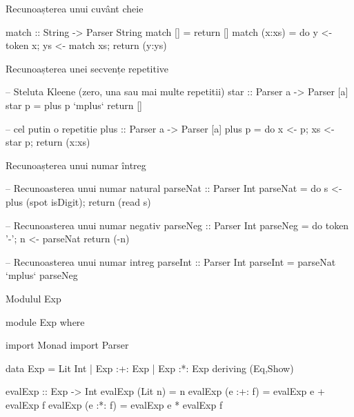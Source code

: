 \documentclass[xcolor=pdftex,romanian,colorlinks]{beamer}
\begin{document}
\begin{frame}[fragile]{Recunoașterea unui cuvânt cheie}
\begin{asciihs}
  match :: String -> Parser String
  match []      = return []
  match (x:xs) = do
                     y <- token x;
                     ys <- match xs;
                     return (y:ys)
\end{asciihs}
\end{frame}



\begin{frame}[fragile]{Recunoașterea unei secvențe repetitive}
\begin{asciihs}
  -- Steluta Kleene (zero, una sau mai multe repetitii)
  star :: Parser a -> Parser [a]
  star p = plus p `mplus` return []

  -- cel putin o repetitie
  plus :: Parser a -> Parser [a]
  plus p = do { x <- p;
                xs <- star p;
                return (x:xs) }
\end{asciihs}
\end{frame}



\begin{frame}[fragile]{Recunoașterea unui numar întreg}
\begin{asciihs}
  -- Recunoasterea unui numar natural
  parseNat :: Parser Int
  parseNat = do { s <- plus (spot isDigit);
                  return (read s) }

  -- Recunoasterea unui numar negativ
  parseNeg :: Parser Int
  parseNeg = do { token '-';
                  n <- parseNat
                  return (-n) }

  -- Recunoasterea unui numar intreg
  parseInt :: Parser Int
  parseInt = parseNat `mplus` parseNeg
\end{asciihs}
\end{frame}



\begin{frame}[fragile]{Modulul Exp}
\begin{asciihs}
  module Exp where

  import Monad
  import Parser

  data Exp = Lit Int
           | Exp :+: Exp
           | Exp :*: Exp
           deriving (Eq,Show)

  evalExp   :: Exp -> Int
  evalExp   (Lit n)    = n
  evalExp   (e :+: f) = evalExp e + evalExp f
  evalExp   (e :*: f) = evalExp e * evalExp f
\end{asciihs}
\end{frame}
\end{document}
